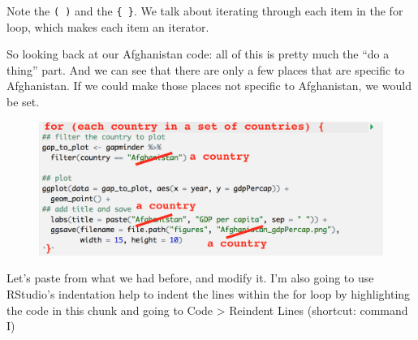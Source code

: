 \documentclass[]{book}
\newenvironment{Shaded}{\begin{snugshade}}{\end{snugshade}}
\newcommand{\KeywordTok}[1]{\textcolor[rgb]{0.13,0.29,0.53}{\textbf{{#1}}}}
\newcommand{\DataTypeTok}[1]{\textcolor[rgb]{0.13,0.29,0.53}{{#1}}}
\newcommand{\DecValTok}[1]{\textcolor[rgb]{0.00,0.00,0.81}{{#1}}}
\newcommand{\StringTok}[1]{\textcolor[rgb]{0.31,0.60,0.02}{{#1}}}
\newcommand{\NormalTok}[1]{{#1}}
\theoremstyle{definition}
\theoremstyle{definition}
\theoremstyle{definition}
\theoremstyle{remark}
\begin{document}
Note the \texttt{(\ )} and the \texttt{\{\ \}}. We talk about iterating
through each item in the for loop, which makes each item an iterator.

So looking back at our Afghanistan code: all of this is pretty much the
``do a thing'' part. And we can see that there are only a few places
that are specific to Afghanistan. If we could make those places not
specific to Afghanistan, we would be set.

\begin{figure}[htbp]
\centering
\includegraphics{img/for_loop_logic.png}
\caption{}
\end{figure}

Let's paste from what we had before, and modify it. I'm also going to
use RStudio's indentation help to indent the lines within the for loop
by highlighting the code in this chunk and going to Code \textgreater{}
Reindent Lines (shortcut: command I)

\begin{Shaded}
\end{Shaded}
\end{document}
